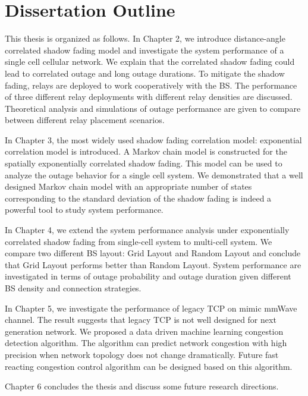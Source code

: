 \section{Dissertation Outline}
\par This thesis is organized as follows. In Chapter 2, we introduce distance-angle correlated shadow fading model and investigate the system performance of a single cell cellular network. We explain that the correlated shadow fading could lead to correlated outage and long outage durations. To mitigate the shadow fading, relays are deployed to work cooperatively with the BS. The performance of three different relay deployments with different relay densities are discussed. Theoretical analysis and simulations of outage performance are given to compare between different relay placement scenarios. 
\par In Chapter 3, the most widely used shadow fading correlation model: exponential correlation model is introduced. A Markov chain model is constructed for the spatially exponentially correlated shadow fading. This model can be used to analyze the outage behavior for a single cell system. We demonstrated that a well designed Markov chain model with an appropriate number of states corresponding to the standard deviation of the shadow fading is indeed a powerful tool to study system performance.
\par In Chapter 4, we extend the system performance analysis under exponentially correlated shadow fading from single-cell system to multi-cell system. We compare two different BS layout: Grid Layout and Random Layout and conclude that Grid Layout performs better than Random Layout. System performance are investigated in terms of outage probability and outage duration given different BS density and connection strategies. 
\par In Chapter 5, we investigate the performance of legacy TCP on mimic mmWave channel. The result suggests that legacy TCP is not well designed for next generation network. We proposed a data driven machine learning congestion detection algorithm. The algorithm can predict network congestion with high precision when network topology does not change dramatically. Future fast reacting congestion control algorithm can be designed based on this algorithm.
\par Chapter 6 concludes the thesis and discuss some future research directions.








